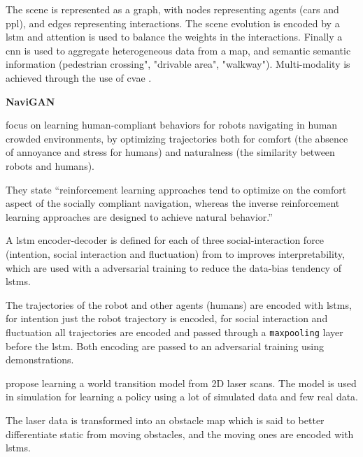 The scene is represented as a graph, with nodes representing agents (cars and ppl), and edges representing interactions.
%
The scene evolution is encoded by a \gls{lstm} and attention is used to balance the weights in the interactions.
%
Finally a \gls{cnn} is used to aggregate heterogeneous data from a map, and semantic semantic information (pedestrian crossing", "drivable area", "walkway"). 
%
Multi-modality is achieved through the use of \gls{cvae} .


\textbf{NaviGAN}

\cite{tsai2020generative} focus on learning human-compliant behaviors for robots navigating in human crowded environments, by optimizing trajectories both for comfort (the absence of annoyance and stress for humans) and naturalness (the similarity between robots and humans).

They state ``reinforcement learning approaches tend to optimize on the comfort aspect of the socially compliant navigation, whereas the inverse reinforcement learning approaches are designed to achieve natural behavior.''

A \gls{lstm} encoder-decoder is defined for each of three social-interaction force (intention, social interaction and fluctuation) from \cite{helbing1995social} to improves interpretability, which are used with a adversarial training to reduce the data-bias tendency of \glspl{lstm}.

The trajectories of the robot and other agents (humans) are encoded with \glspl{lstm}, for intention just the robot trajectory is encoded, for social interaction and fluctuation all trajectories are encoded and passed through a \texttt{maxpooling} layer before the \gls{lstm}.
%
Both encoding are passed to an adversarial training using demonstrations.




\cite{cui2021learning} propose learning a world transition model from 2D laser scans. The model is used in simulation for learning a policy using a lot of simulated data and few real data.

The laser data is transformed into an obstacle map which is said to better differentiate static from moving obstacles, and the moving ones are encoded with \glspl{lstm}.

